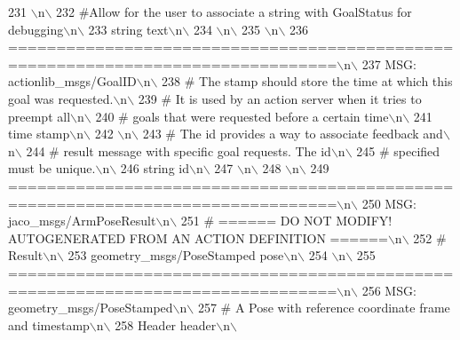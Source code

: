 \begin{DoxyCode}
231 \textcolor{stringliteral}{\(\backslash\)n\(\backslash\)}
232 \textcolor{stringliteral}{#Allow for the user to associate a string with GoalStatus for debugging\(\backslash\)n\(\backslash\)}
233 \textcolor{stringliteral}{string text\(\backslash\)n\(\backslash\)}
234 \textcolor{stringliteral}{\(\backslash\)n\(\backslash\)}
235 \textcolor{stringliteral}{\(\backslash\)n\(\backslash\)}
236 \textcolor{stringliteral}{================================================================================\(\backslash\)n\(\backslash\)}
237 \textcolor{stringliteral}{MSG: actionlib\_msgs/GoalID\(\backslash\)n\(\backslash\)}
238 \textcolor{stringliteral}{# The stamp should store the time at which this goal was requested.\(\backslash\)n\(\backslash\)}
239 \textcolor{stringliteral}{# It is used by an action server when it tries to preempt all\(\backslash\)n\(\backslash\)}
240 \textcolor{stringliteral}{# goals that were requested before a certain time\(\backslash\)n\(\backslash\)}
241 \textcolor{stringliteral}{time stamp\(\backslash\)n\(\backslash\)}
242 \textcolor{stringliteral}{\(\backslash\)n\(\backslash\)}
243 \textcolor{stringliteral}{# The id provides a way to associate feedback and\(\backslash\)n\(\backslash\)}
244 \textcolor{stringliteral}{# result message with specific goal requests. The id\(\backslash\)n\(\backslash\)}
245 \textcolor{stringliteral}{# specified must be unique.\(\backslash\)n\(\backslash\)}
246 \textcolor{stringliteral}{string id\(\backslash\)n\(\backslash\)}
247 \textcolor{stringliteral}{\(\backslash\)n\(\backslash\)}
248 \textcolor{stringliteral}{\(\backslash\)n\(\backslash\)}
249 \textcolor{stringliteral}{================================================================================\(\backslash\)n\(\backslash\)}
250 \textcolor{stringliteral}{MSG: jaco\_msgs/ArmPoseResult\(\backslash\)n\(\backslash\)}
251 \textcolor{stringliteral}{# ====== DO NOT MODIFY! AUTOGENERATED FROM AN ACTION DEFINITION ======\(\backslash\)n\(\backslash\)}
252 \textcolor{stringliteral}{# Result\(\backslash\)n\(\backslash\)}
253 \textcolor{stringliteral}{geometry\_msgs/PoseStamped pose\(\backslash\)n\(\backslash\)}
254 \textcolor{stringliteral}{\(\backslash\)n\(\backslash\)}
255 \textcolor{stringliteral}{================================================================================\(\backslash\)n\(\backslash\)}
256 \textcolor{stringliteral}{MSG: geometry\_msgs/PoseStamped\(\backslash\)n\(\backslash\)}
257 \textcolor{stringliteral}{# A Pose with reference coordinate frame and timestamp\(\backslash\)n\(\backslash\)}
258 \textcolor{stringliteral}{Header header\(\backslash\)n\(\backslash\)}

\end{DoxyCode}
